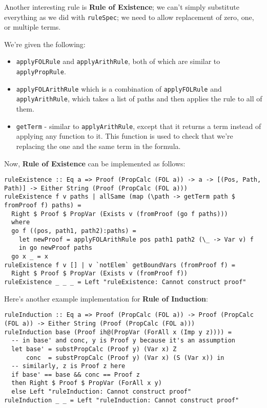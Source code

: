 \documentclass{article}
\begin{document}
Another interesting rule is \textbf{Rule of Existence}; we can't simply substitute everything as we did with \texttt{ruleSpec}; we need to allow replacement of zero, one, or multiple terms.

We're given the following:

\begin{itemize}
\item \texttt{applyFOLRule} and \texttt{applyArithRule}, both of which are similar to \texttt{applyPropRule}.
\item \texttt{applyFOLArithRule} which is a combination of \texttt{applyFOLRule} and \texttt{applyArithRule}, which takes a list of paths and then applies the rule to all of them.
\item \texttt{getTerm} - similar to \texttt{applyArithRule}, except that it returns a term instead of applying any function to it. This function is used to check that we're replacing the one and the same term in the formula.
\end{itemize}

Now, \textbf{Rule of Existence} can be implemented as follows:

\begin{lstlisting}
ruleExistence :: Eq a => Proof (PropCalc (FOL a)) -> a -> [(Pos, Path, Path)] -> Either String (Proof (PropCalc (FOL a)))
ruleExistence f v paths | allSame (map (\path -> getTerm path $ fromProof f) paths) =
  Right $ Proof $ PropVar (Exists v (fromProof (go f paths)))
  where
  go f ((pos, path1, path2):paths) =
    let newProof = applyFOLArithRule pos path1 path2 (\_ -> Var v) f
    in go newProof paths
  go x _ = x
ruleExistence f v [] | v `notElem` getBoundVars (fromProof f) =
  Right $ Proof $ PropVar (Exists v (fromProof f))
ruleExistence _ _ _ = Left "ruleExistence: Cannot construct proof"
\end{lstlisting}

Here's another example implementation for \textbf{Rule of Induction}:

\begin{lstlisting}
ruleInduction :: Eq a => Proof (PropCalc (FOL a)) -> Proof (PropCalc (FOL a)) -> Either String (Proof (PropCalc (FOL a)))
ruleInduction base (Proof ih@(PropVar (ForAll x (Imp y z)))) =
  -- in base' and conc, y is Proof y because it's an assumption
  let base' = substPropCalc (Proof y) (Var x) Z
      conc  = substPropCalc (Proof y) (Var x) (S (Var x)) in
  -- similarly, z is Proof z here
  if base' == base && conc == Proof z
  then Right $ Proof $ PropVar (ForAll x y)
  else Left "ruleInduction: Cannot construct proof"
ruleInduction _ _ = Left "ruleInduction: Cannot construct proof"
\end{lstlisting}
\end{document}

